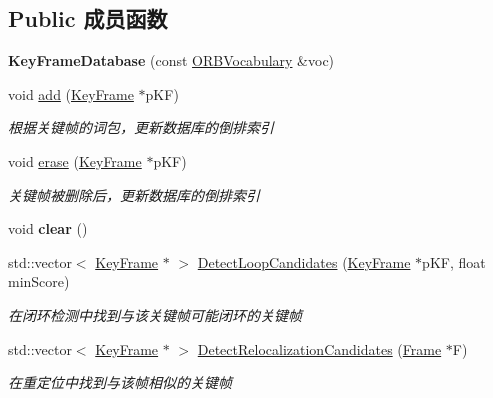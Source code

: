 \subsection*{Public 成员函数}
\begin{DoxyCompactItemize}
\item 
\hypertarget{classORB__SLAM2_1_1KeyFrameDatabase_a83495a11d1fb3cd98e82fa1e2efb6920}{{\bfseries Key\-Frame\-Database} (const \hyperlink{classDBoW2_1_1TemplatedVocabulary}{O\-R\-B\-Vocabulary} \&voc)}\label{classORB__SLAM2_1_1KeyFrameDatabase_a83495a11d1fb3cd98e82fa1e2efb6920}

\item 
void \hyperlink{classORB__SLAM2_1_1KeyFrameDatabase_a1b3a362116e3ecf2cd7e151be2ca3fcb}{add} (\hyperlink{classORB__SLAM2_1_1KeyFrame}{Key\-Frame} $\ast$p\-K\-F)
\begin{DoxyCompactList}\small\item\em 根据关键帧的词包，更新数据库的倒排索引 \end{DoxyCompactList}\item 
void \hyperlink{classORB__SLAM2_1_1KeyFrameDatabase_aa5b56ae1d1cb827fb4602abd61d77a06}{erase} (\hyperlink{classORB__SLAM2_1_1KeyFrame}{Key\-Frame} $\ast$p\-K\-F)
\begin{DoxyCompactList}\small\item\em 关键帧被删除后，更新数据库的倒排索引 \end{DoxyCompactList}\item 
\hypertarget{classORB__SLAM2_1_1KeyFrameDatabase_a3eccf99ba2e387d0273f919fd0574ea2}{void {\bfseries clear} ()}\label{classORB__SLAM2_1_1KeyFrameDatabase_a3eccf99ba2e387d0273f919fd0574ea2}

\item 
std\-::vector$<$ \hyperlink{classORB__SLAM2_1_1KeyFrame}{Key\-Frame} $\ast$ $>$ \hyperlink{classORB__SLAM2_1_1KeyFrameDatabase_a2d396aae02c4318ea8c7e7eff8059c69}{Detect\-Loop\-Candidates} (\hyperlink{classORB__SLAM2_1_1KeyFrame}{Key\-Frame} $\ast$p\-K\-F, float min\-Score)
\begin{DoxyCompactList}\small\item\em 在闭环检测中找到与该关键帧可能闭环的关键帧 \end{DoxyCompactList}\item 
std\-::vector$<$ \hyperlink{classORB__SLAM2_1_1KeyFrame}{Key\-Frame} $\ast$ $>$ \hyperlink{classORB__SLAM2_1_1KeyFrameDatabase_a008586e4d07ece0d948d0f1633447a2b}{Detect\-Relocalization\-Candidates} (\hyperlink{classORB__SLAM2_1_1Frame}{Frame} $\ast$F)
\begin{DoxyCompactList}\small\item\em 在重定位中找到与该帧相似的关键帧 \end{DoxyCompactList}\end{DoxyCompactItemize}
